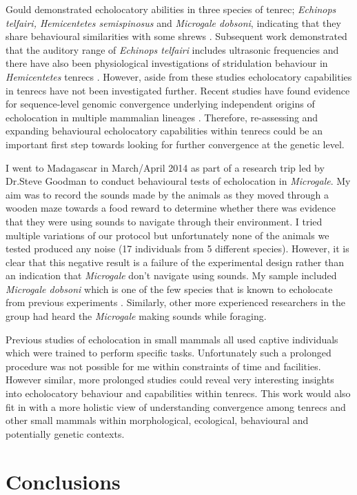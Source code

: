 	Gould \citeyear{Gould1965} demonstrated echolocatory abilities in three species of tenrec; \textit{Echinops telfairi, Hemicentetes semispinosus} and \textit{Microgale dobsoni}, indicating that they share behavioural similarities with some shrews \citep{Gould1964, Tomasi1979, Siemers2009}. Subsequent work demonstrated that the auditory range of \textit{Echinops telfairi} includes ultrasonic frequencies \citep{Drexl2003} and there have also been physiological investigations of stridulation behaviour in \textit{Hemicentetes} tenrecs \citep{Eisenberg1969, Endo2010}. However, aside from these studies echolocatory capabilities in tenrecs have not been investigated further. Recent studies have found evidence for sequence-level genomic convergence underlying independent origins of echolocation in multiple mammalian lineages \citep{Parker2013}. Therefore, re-assessing and expanding behavioural echolocatory capabilities within tenrecs could be an important first step towards looking for further convergence at the genetic level.

	I went to Madagascar in March/April 2014 as part of a research trip led by Dr.Steve Goodman to conduct behavioural tests of echolocation in \textit{Microgale}. My aim was to record the sounds made by the animals as they moved through a wooden maze towards a food reward to determine whether there was evidence that they were using sounds to navigate through their environment. I tried multiple variations of our protocol but unfortunately none of the animals we tested produced any noise (17 individuals from 5 different species). However, it is clear that this negative result is a failure of the experimental design rather than an indication that \textit{Microgale} don't navigate using sounds. My sample included \textit{Microgale dobsoni} which is one of the few species that is known to echolocate from previous experiments \citep{Gould1965}. Similarly, other more experienced researchers in the group had heard the \textit{Microgale} making sounds while foraging. 
	
	Previous studies of echolocation in small mammals \citep{Gould1964, Gould1965, Tomasi1979, Siemers2009} all used captive individuals which were trained to perform specific tasks. Unfortunately such a prolonged procedure was not possible for me within constraints of time and facilities. However similar, more prolonged studies could reveal very interesting insights into echolocatory behaviour and capabilities within tenrecs. This work would also fit in with a more holistic view of understanding convergence among tenrecs and other small mammals within morphological, ecological, behavioural and potentially genetic contexts.



\section{Conclusions}



